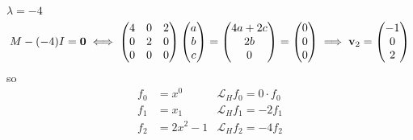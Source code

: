 \documentclass[10pt, a4paper]{article}
\begin{document}
\begin{problem}
\begin{solution}
\begin{enumerate}[label = (\alph*)]
\[            \]
            $\lambda = -4$
            \[
            M - (-4)I = \mathbf{0} \iff \begin{pmatrix}
                4 & 0 & 2 \\
                0 & 2 & 0 \\
                0 & 0 & 0
            \end{pmatrix}\begin{pmatrix}
                a \\ b \\ c
            \end{pmatrix} = \begin{pmatrix}
                4a + 2c \\ 2b \\ 0
            \end{pmatrix} = \begin{pmatrix}
                0 \\ 0 \\ 0
            \end{pmatrix} \implies \mathbf{v}_2 = \begin{pmatrix}
                -1 \\ 0 \\ 2
            \end{pmatrix}
            \]
            so
            \begin{align*}
                f_0 &= x ^ 0 & \mathcal{L}_Hf_0 = 0 \cdot f_0 \\
                f_1 &= x_1 & \mathcal{L}_Hf_1 = -2f_1\\
                f_2 &= 2x ^ 2 - 1 & \mathcal{L}_Hf_2 = -4f_2
            \end{align*}


\end{enumerate}
\end{solution}
\end{problem}
\end{document}
